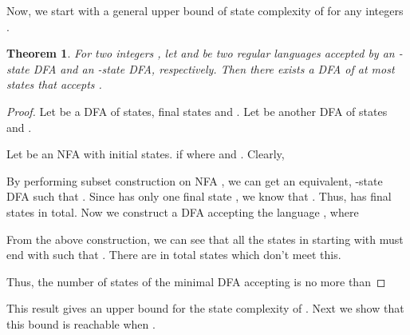 \documentclass[10pt]{article}
\newtheorem{theorem}{Theorem}
\begin{document}
Now, we start with a general upper bound of state complexity of
 for any integers .
\begin{theorem}
\label{L_1^R L_2 upper bound} For two integers , let
 and  be two regular languages accepted by an -state
DFA and an -state DFA, respectively. Then there exists a DFA of
at most  states that accepts .
\end{theorem}
\begin{proof}
Let  be a DFA of  states,
 final states and . Let  be another DFA of  states and .

Let  be an NFA with
 initial states.  if 
where  and . Clearly,


By performing subset construction on NFA , we can get an
equivalent, -state DFA 
such that . Since  has only one final state ,
we know that . Thus,  has
 final states in total. Now we construct a DFA
 accepting the language , where

From the above construction, we can see that all the states in 
starting with  must end with  such that .
There are in total  states which don't meet
this.

Thus, the number of states of the minimal DFA accepting 
is no more than

\end{proof}

This result gives an upper bound for the state complexity of . Next we show that this bound is reachable when .
\end{document}
